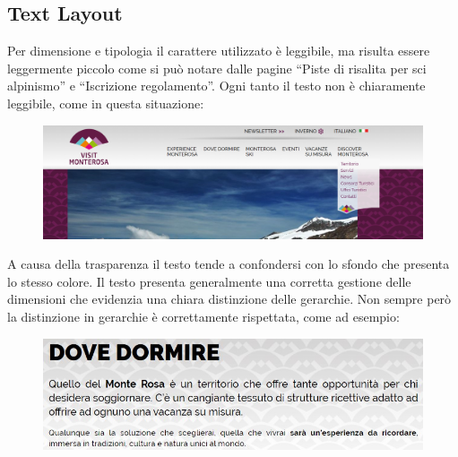         \subsection{Text Layout}
        Per dimensione e tipologia il carattere utilizzato è leggibile, ma
        risulta essere leggermente piccolo come si può notare  dalle pagine
        “Piste di risalita per sci alpinismo” e “Iscrizione regolamento”.
        Ogni tanto il testo non è chiaramente leggibile, come in questa
        situazione:
        \begin{center}
            \begin{figure}[H]
                \includegraphics[scale=0.15]{resources/images/textLayout2.png}
            \end{figure}
        \end{center}
        A causa della trasparenza il testo tende a confondersi con lo sfondo che
        presenta lo stesso colore. Il testo presenta generalmente una corretta gestione delle
        dimensioni che evidenzia una chiara distinzione delle gerarchie.
        Non sempre però la distinzione in gerarchie è correttamente rispettata, come ad esempio:
        \begin{center}
            \begin{figure}[H]
                \includegraphics[scale=0.6]{resources/images/textLayout4.jpg}
            \end{figure}
        \end{center}
